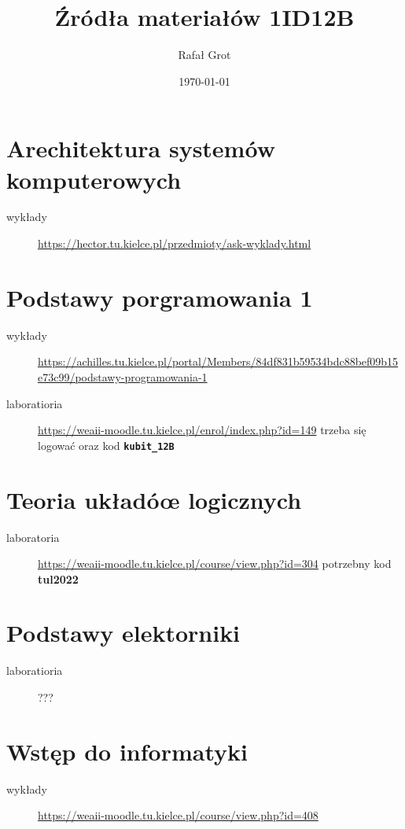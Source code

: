 \documentclass[11pt]{article}
\author{Rafał Grot}
\date{\today}
\title{Źródła materiałów 1ID12B}
\begin{document}
\maketitle
\tableofcontents


\section{Arechitektura systemów komputerowych}
\label{sec:orga241b87}
\begin{description}
\item[{wykłady}] \url{https://hector.tu.kielce.pl/przedmioty/ask-wyklady.html}
\end{description}
\section{Podstawy porgramowania 1}
\label{sec:org59472b3}
\begin{description}
\item[{wykłady}] \url{https://achilles.tu.kielce.pl/portal/Members/84df831b59534bdc88bef09b15e73c99/podstawy-programowania-1}
\item[{laboratioria}] \url{https://weaii-moodle.tu.kielce.pl/enrol/index.php?id=149} trzeba się logować oraz kod \textbf{\texttt{kubit\_12B}}
\end{description}
\section{Teoria układóœ logicznych}
\label{sec:org5d65c4f}
\begin{description}
\item[{laboratoria}] \url{https://weaii-moodle.tu.kielce.pl/course/view.php?id=304} potrzebny kod \textbf{tul2022}
\end{description}
\section{Podstawy elektorniki}
\label{sec:orgdc0e354}
\begin{description}
\item[{laboratioria}] ???
\end{description}
\section{Wstęp do informatyki}
\label{sec:orga7abda8}
\begin{description}
\item[{wykłady}] \url{https://weaii-moodle.tu.kielce.pl/course/view.php?id=408}
\end{description}
\end{document}
